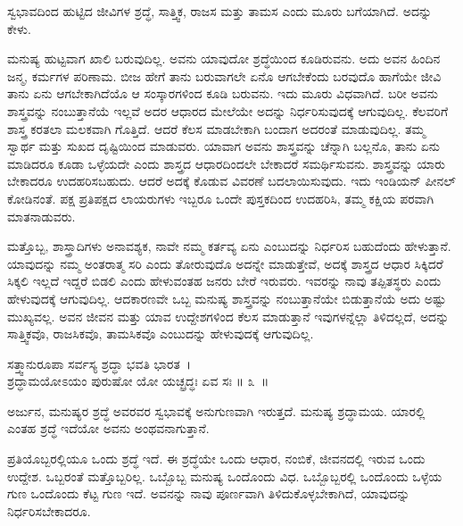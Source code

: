 \begin{artha}
ಸ್ವಭಾವದಿಂದ ಹುಟ್ಟಿದ ಜೀವಿಗಳ ಶ್ರದ್ಧೆ, ಸಾತ್ತ್ವಿಕ, ರಾಜಸ ಮತ್ತು ತಾಮಸ ಎಂದು ಮೂರು ಬಗೆಯಾಗಿದೆ. ಅದನ್ನು ಕೇಳು.
\end{artha}

ಮನುಷ್ಯ ಹುಟ್ಟವಾಗ ಖಾಲಿ ಬರುವುದಿಲ್ಲ. ಅವನು ಯಾವುದೋ ಶ್ರದ್ಧೆಯಿಂದ ಕೂಡಿರು\-ವನು. ಅದು ಅವನ ಹಿಂದಿನ ಜನ್ಮ, ಕರ್ಮಗಳ ಪರಿಣಾಮ. ಬೀಜ ಹೇಗೆ ತಾನು ಬರುವಾಗಲೇ ಏನೊ ಆಗಬೇಕೆಂದು ಬರವುದೊ ಹಾಗೆಯೇ ಜೀವಿ ತಾನು ಏನು ಆಗಬೇಕಾಗಿದೆಯೊ ಆ ಸಂಸ್ಕಾರಗಳಿಂದ ಕೂಡಿ ಬರುವನು. ಇದು ಮೂರು ವಿಧವಾಗಿದೆ. ಬರೀ ಅವನು ಶಾಸ್ತ್ರವನ್ನು ನಂಬುತ್ತಾನೆಯೆ ಇಲ್ಲವೆ ಅದರ ಆಧಾರದ ಮೇಲೆಯೇ ಅದನ್ನು ನಿರ್ಧರಿಸುವುದಕ್ಕೆ ಆಗುವುದಿಲ್ಲ. ಕೆಲವರಿಗೆ ಶಾಸ್ತ್ರ ಕರತಲಾ ಮಲಕವಾಗಿ ಗೊತ್ತಿದೆ. ಆದರೆ ಕೆಲಸ ಮಾಡಬೇಕಾಗಿ ಬಂದಾಗ ಅದರಂತೆ ಮಾಡುವುದಿಲ್ಲ. ತಮ್ಮ ಸ್ವಾರ್ಥ ಮತ್ತು ಸುಖದ ದೃಷ್ಟಿಯಿಂದ ಮಾಡುವರು. ಯಾವಾಗ ಅವನು ಶಾಸ್ತ್ರವನ್ನು ಚೆನ್ನಾಗಿ ಬಲ್ಲನೊ, ತಾನು ಏನು ಮಾಡಿದರೂ ಕೂಡಾ ಒಳ್ಳೆಯದೇ ಎಂದು ಶಾಸ್ತ್ರದ ಆಧಾರದಿಂದಲೇ ಬೇಕಾದರೆ ಸಮರ್ಥಿಸುವನು. ಶಾಸ್ತ್ರವನ್ನು ಯಾರು ಬೇಕಾದರೂ ಉದಹರಿಸಬಹುದು. ಆದರೆ ಅದಕ್ಕೆ ಕೊಡುವ ವಿವರಣೆ ಬದಲಾಯಿಸುವುದು. ಇದು ಇಂಡಿಯನ್ ಪೀನಲ್ ಕೋಡಿನಂತೆ. ಪಕ್ಷ ಪ್ರತಿಪಕ್ಷದ ಲಾಯರುಗಳು ಇಬ್ಬರೂ ಒಂದೇ ಪುಸ್ತಕದಿಂದ ಉದಹರಿಸಿ, ತಮ್ಮ ಕಕ್ಷಿಯ ಪರವಾಗಿ ಮಾತನಾಡುವರು.

ಮತ್ತೊಬ್ಬ, ಶಾಸ್ತ್ರಾದಿಗಳು ಅನಾವಶ್ಯಕ, ನಾವೇ ನಮ್ಮ ಕರ್ತವ್ಯ ಏನು ಎಂಬುದನ್ನು ನಿರ್ಧರಿಸ ಬಹುದೆಂದು ಹೇಳುತ್ತಾನೆ. ಯಾವುದನ್ನು ನಮ್ಮ ಅಂತರಾತ್ಮ ಸರಿ ಎಂದು ತೋರುವುದೊ ಅದನ್ನೇ ಮಾಡುತ್ತೇವೆ, ಅದಕ್ಕೆ ಶಾಸ್ತ್ರದ ಆಧಾರ ಸಿಕ್ಕಿದರೆ ಸಿಕ್ಕಲಿ ಇಲ್ಲದೆ ಇದ್ದರೆ ಬಿಡಲಿ ಎಂದು ಹೇಳುವಂತಹ ಜನರು ಬೇರೆ ಇರುವರು. ಇವರನ್ನು ನಾವು ತಪ್ಪಿತಸ್ಥರು ಎಂದು ಹೇಳುವುದಕ್ಕೆ ಆಗುವುದಿಲ್ಲ. ಆದಕಾರಣವೇ ಒಬ್ಬ ಮನುಷ್ಯ ಶಾಸ್ತ್ರವನ್ನು ನಂಬುತ್ತಾನೆಯೇ ಬಿಡುತ್ತಾನೆಯೆ ಅದು ಅಷ್ಟು ಮುಖ್ಯವಲ್ಲ. ಅವನ ಜೀವನ ಮತ್ತು ಯಾವ ಉದ್ದೇಶಗಳಿಂದ ಕೆಲಸ ಮಾಡುತ್ತಾನೆ ಇವುಗಳನ್ನೆಲ್ಲಾ ತಿಳಿದಲ್ಲದೆ, ಅದನ್ನು ಸಾತ್ತ್ವಿಕವೊ, ರಾಜಸಿಕವೊ, ತಾಮಸಿಕವೊ ಎಂಬುದನ್ನು ಹೇಳುವುದಕ್ಕೆ ಆಗುವುದಿಲ್ಲ.

\begin{shloka}
ಸತ್ತ್ವಾನುರೂಪಾ ಸರ್ವಸ್ಯ ಶ್ರದ್ಧಾ ಭವತಿ ಭಾರತ~।\\ಶ್ರದ್ಧಾಮಯೋಽಯಂ ಪುರುಷೋ ಯೋ ಯಚ್ಛ್ರದ್ಧಃ ಏವ ಸಃ \hfill॥ ೩~॥
\end{shloka}

\begin{artha}
ಅರ್ಜುನ, ಮನುಷ್ಯರ ಶ್ರದ್ಧೆ ಅವರವರ ಸ್ವಭಾವಕ್ಕೆ ಅನುಗುಣವಾಗಿ ಇರುತ್ತದೆ. ಮನುಷ್ಯ ಶ್ರದ್ಧಾಮಯ. ಯಾರಲ್ಲಿ ಎಂತಹ ಶ್ರದ್ಧೆ ಇದೆಯೋ ಅವನು ಅಂಥವನಾಗುತ್ತಾನೆ.
\end{artha}

ಪ್ರತಿಯೊಬ್ಬರಲ್ಲಿಯೂ ಒಂದು ಶ್ರದ್ಧೆ ಇದೆ. ಈ ಶ್ರದ್ಧೆಯೇ ಒಂದು ಆಧಾರ, ನಂಬಿಕೆ, ಜೀವನದಲ್ಲಿ ಇರುವ ಒಂದು ಉದ್ದೇಶ. ಒಬ್ಬರಂತೆ ಮತ್ತೊಬ್ಬರಿಲ್ಲ. ಒಬ್ಬೊಬ್ಬ ಮನುಷ್ಯ ಒಂದೊಂದು ವಿಧ. ಒಬ್ಬೊಬ್ಬರಲ್ಲಿ ಒಂದೊಂದು ಒಳ್ಳೆಯ ಗುಣ ಒಂದೊಂದು ಕೆಟ್ಟ ಗುಣ ಇದೆ. ಅವನನ್ನು ನಾವು ಪೂರ್ಣವಾಗಿ ತಿಳಿದುಕೊಳ್ಳಬೇಕಾಗಿದೆ, ಯಾವುದನ್ನು ನಿರ್ಧರಿಸಬೇಕಾದರೂ.

